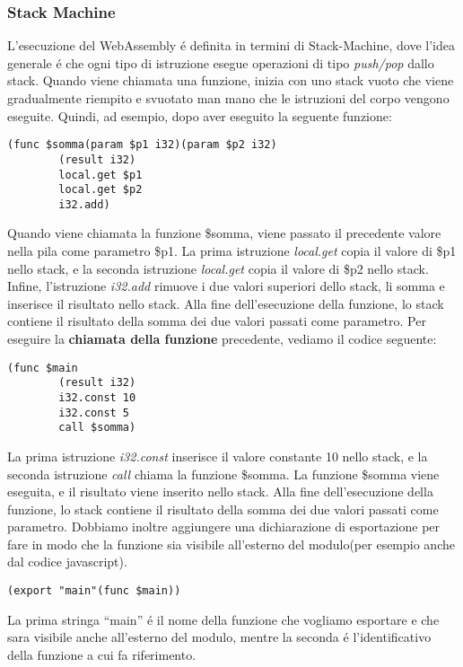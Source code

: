 \documentclass[../../main.tex]{subfiles}
\begin{document}
\subsubsection{Stack Machine}
L'esecuzione del WebAssembly é definita in termini di Stack-Machine, dove l'idea generale é che ogni tipo di istruzione esegue operazioni di tipo \textit{push/pop} dallo stack.
Quando viene chiamata una funzione, inizia con uno stack vuoto che viene gradualmente riempito e svuotato man mano che le istruzioni del corpo vengono eseguite. Quindi, ad esempio, dopo aver eseguito la seguente funzione:
\begin{lstlisting}[language=WebAssembly]
    (func $somma(param $p1 i32)(param $p2 i32)
        (result i32)
        local.get $p1
        local.get $p2
        i32.add)
\end{lstlisting}
Quando viene chiamata la funzione \$somma, viene passato il precedente valore nella pila come parametro \$p1. La prima istruzione \textit{local.get} copia il valore di \$p1 nello stack, e la seconda istruzione \textit{local.get} copia il valore di \$p2 nello stack. Infine, l'istruzione \textit{i32.add} rimuove i due valori superiori dello stack, li somma e inserisce il risultato nello stack. Alla fine dell'esecuzione della funzione, lo stack contiene il risultato della somma dei due valori passati come parametro.
Per eseguire la \textbf{chiamata della funzione} precedente, vediamo il codice seguente:
\begin{lstlisting}[language=WebAssembly]
    (func $main
        (result i32)
        i32.const 10
        i32.const 5
        call $somma)
\end{lstlisting}
La prima istruzione \textit{i32.const} inserisce il valore constante 10 nello stack, e la seconda istruzione \textit{call} chiama la funzione \$somma. La funzione \$somma viene eseguita, e il risultato viene inserito nello stack. Alla fine dell'esecuzione della funzione, lo stack contiene il risultato della somma dei due valori passati come parametro.
Dobbiamo inoltre aggiungere una dichiarazione di esportazione per fare in modo che la funzione sia visibile all'esterno del modulo(per esempio anche dal codice javascript).
\begin{lstlisting}[language=WebAssembly]
    (export "main"(func $main))
\end{lstlisting}
La prima stringa ``main'' é il nome della funzione che vogliamo esportare e che sara visibile anche all'esterno del modulo, mentre la seconda é l'identificativo della funzione a cui fa riferimento.
\end{document}
